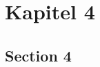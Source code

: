 \documentclass[../main.tex]{subfiles}
\begin{document}
\chapter{Kapitel 4}

\section{Section 4}
\end{document}
